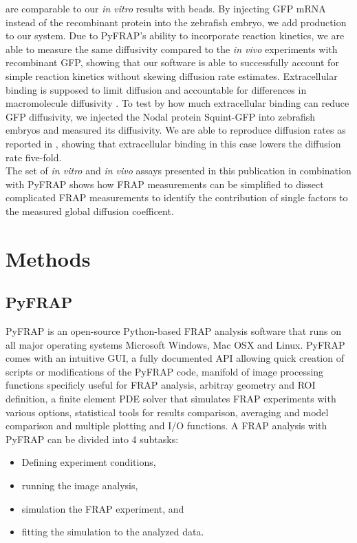 \documentclass[a4paper,10pt,twocolumn]{article}
\newcommand{\invivo}{\textit{in vivo }}
\newcommand{\invitro}{\textit{in vitro }}
\begin{document}
are comparable to our \invitro results with beads. By injecting GFP mRNA instead of the recombinant protein into the zebrafish embryo, we add production to our system. Due to PyFRAP's ability to incorporate
reaction kinetics, we are able to measure the same diffusivity compared to the \invivo experiments with recombinant GFP, showing that our software is able to successfully account for simple reaction kinetics
without skewing diffusion rate estimates. Extracellular binding is supposed to limit diffusion and accountable for differences in macromolecule diffusivity \citep{Mueller2013}. To test by how much 
extracellular binding can reduce GFP diffusivity, we injected the Nodal protein Squint-GFP into zebrafish embryos and measured its diffusivity. We are able to reproduce diffusion rates as reported in
\citep{Mueller2012}, showing that extracellular binding in this case lowers the diffusion rate five-fold.\\
The set of \invitro and \invivo assays presented in this publication in combination with PyFRAP shows how FRAP measurements can be simplified to dissect complicated FRAP measurements to identify the contribution
of single factors to the measured global diffusion coefficent.

\section{Methods}

\subsection{PyFRAP}

PyFRAP is an open-source Python-based FRAP analysis software that runs on all major operating systems Microsoft Windows, Mac OSX and Linux. PyFRAP comes with an intuitive GUI, a fully documented API allowing 
quick creation of scripts or modifications of the PyFRAP code, manifold of image processing functions specificly useful for FRAP analysis, arbitray geometry and ROI definition, a finite element PDE solver 
that simulates FRAP experiments with various options, statistical tools for results comparison, averaging and model comparison and multiple plotting and I/O functions. A FRAP analysis with PyFRAP can be 
divided into 4 subtasks:

\begin{itemize}
 \item Defining experiment conditions,
 \item running the image analysis,
 \item simulation the FRAP experiment, and
 \item fitting the simulation to the analyzed data.
\end{itemize}
\end{document}
